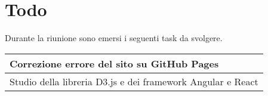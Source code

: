 \section{Todo}
Durante la riunione sono emersi i seguenti task da svolgere.

\begin{center}
  \begin{tabular}{|p{7cm}|}
    \hline
    Correzione errore del sito su GitHub Pages\\ \hline
    Studio della libreria D3.js e dei framework Angular e React\\ \hline
   \end{tabular}
\end{center}
